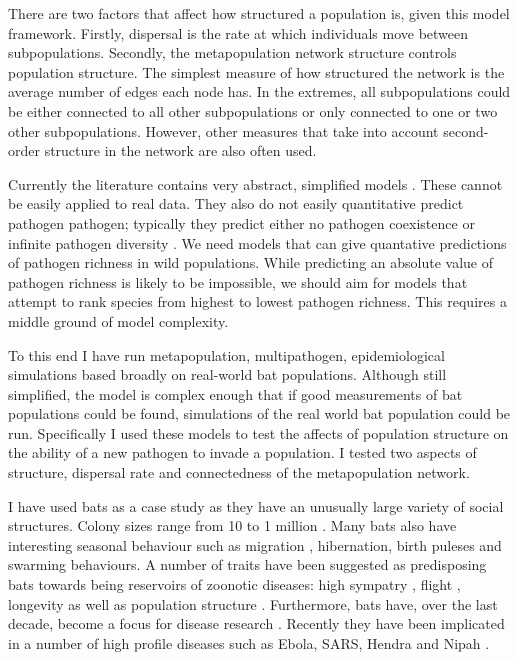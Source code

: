 There are two factors that affect how structured a population is, given this model framework.
Firstly, dispersal is the rate at which individuals move between subpopulations.
Secondly, the metapopulation network structure controls population structure.
The simplest measure of how structured the network is the average number of edges each node has.
In the extremes, all subpopulations could be either connected to all other subpopulations or only connected to one or two other subpopulations.
However, other measures that take into account second-order structure in the network are also often used.






Currently the literature contains very abstract, simplified models \cite{qiu2013vector, allen2004sis, nunes2006localized}.
These cannot be easily applied to real data.
They also do not easily quantitative predict pathogen pathogen; typically they predict either no pathogen coexistence \cite{bremermann1989competitive, martcheva2013competitive} or infinite pathogen diversity \cite{may1994superinfection}.
We need models that can give quantative predictions of pathogen richness in wild populations.
While predicting an absolute value of pathogen richness is likely to be impossible, we should aim for models that attempt to rank species from highest to lowest pathogen richness.
This requires a middle ground of model complexity.


To this end I have run metapopulation, multipathogen, epidemiological simulations based broadly on real-world bat populations.
Although still simplified, the model is complex enough that if good measurements of bat populations could be found, simulations of the real world bat population could be run.
Specifically I used these models to test the affects of population structure on the ability of a new pathogen to invade a population.
I tested two aspects of structure, dispersal rate and connectedness of the metapopulation network.


I have used bats as a case study as they have an unusually large variety of social structures.
Colony sizes range from 10 to 1 million \cite{jones2009pantheria}.
Many bats also have interesting seasonal behaviour such as migration \cite{richter2008first, fleming2003ecology}, hibernation, birth puleses and swarming behaviours.
A number of traits have been suggested as predisposing bats towards being reservoirs of zoonotic diseases: high sympatry \cite{luis2013comparison}, flight \cite{wang2011mass}, longevity \cite{wang2011mass} as well as population structure \cite{maganga2014bat, turmelle2009correlates, gay2014parasite}.
Furthermore, bats have, over the last decade, become a focus for disease research  \cite{calisher2006bats, hughes2007emerging}.
Recently they have been implicated in a number of high profile diseases such as Ebola, SARS, Hendra and Nipah  \cite{calisher2006bats, li2005bats}.




